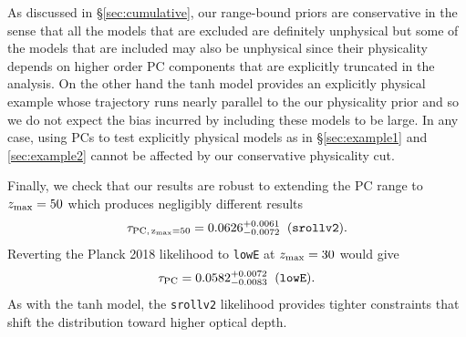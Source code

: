 \documentclass[prd,twocolumn,amsmath,amssymb,floatfix,superscriptaddress,nofootinbib]{revtex4-1}
\newcommand{\zmax}{z_{\rm max}}
\newcommand{\beq}{\begin{equation}}
\newcommand{\eeq}{\end{equation}}
\begin{document}
{{As discussed in \S \ref{sec:cumulative}, our range-bound priors 
are conservative in the sense that all the models that are excluded are definitely unphysical but some of the models that are included
may also be unphysical since their physicality depends on higher order PC components that are explicitly truncated in the analysis.  On the other hand the tanh model provides an explicitly physical example whose trajectory runs nearly parallel to the our physicality prior and so we do not expect the bias incurred by 
including these models to be large.   In any case, using PCs to 
test explicitly physical models as in \S \ref{sec:example1} and
\ref{sec:example2} cannot be affected by our conservative physicality
cut.

Finally, we check that our results are robust to 
 extending the PC
range to
$z_{\rm max}=50$ which produces negligibly different results
\beq
\tau_{\rm PC,\, \zmax=50} = 0.0626^{+0.0061}_{-0.0072}\;\; (\texttt{srollv2}).
\eeq
Reverting the Planck 2018 likelihood to \texttt{lowE} at $z_{\rm max}=30$ would give
\beq
\tau_{\rm PC} = 0.0582 ^{+0.0072}_{-0.0083}\;\; (\texttt{lowE}).
\eeq
As with the tanh model, the \texttt{srollv2} likelihood provides tighter constraints that shift the distribution toward higher optical depth.











}}
\end{document}
